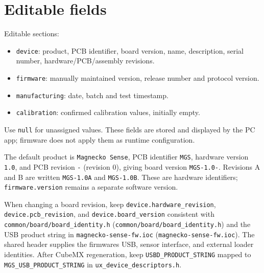 \documentclass[10pt,a4paper,oneside]{report}
\providecommand{\tightlist}{\setlength{\itemsep}{1pt}\setlength{\parskip}{1pt}}
\begin{document}
\section{Editable fields}\label{wiki-firmware-parameters--editable-fields}

Editable sections:

\begin{itemize}
\tightlist
\item
  \texttt{device}: product, PCB identifier, board version, name, description, serial number, hardware/PCB/assembly revisions.
\item
  \texttt{firmware}: manually maintained version, release number and protocol version.
\item
  \texttt{manufacturing}: date, batch and test timestamp.
\item
  \texttt{calibration}: confirmed calibration values, initially empty.
\end{itemize}

Use \texttt{null} for unassigned values. These fields are stored and displayed by the PC app; firmware does not apply them as runtime configuration.

The default product is \texttt{Magnecko Sense}, PCB identifier \texttt{MGS}, hardware version \texttt{1.\allowbreak{}0}, and PCB revision \texttt{-\allowbreak{}} (revision 0), giving board version \texttt{MGS-\allowbreak{}1.\allowbreak{}0-\allowbreak{}}. Revisions A and B are written \texttt{MGS-\allowbreak{}1.\allowbreak{}0A} and \texttt{MGS-\allowbreak{}1.\allowbreak{}0B}. These are hardware identifiers; \texttt{firmware.\allowbreak{}version} remains a separate software version.

When changing a board revision, keep \texttt{device.\allowbreak{}hardware\_\allowbreak{}revision}, \texttt{device.\allowbreak{}pcb\_\allowbreak{}revision}, and \texttt{device.\allowbreak{}board\_\allowbreak{}version} consistent with {\texttt{common/\allowbreak{}board/\allowbreak{}board\_\allowbreak{}identity.\allowbreak{}h} (\nolinkurl{common/board/board_identity.h})} and the USB product string in {\texttt{magnecko-\allowbreak{}sense-\allowbreak{}fw.\allowbreak{}ioc} (\nolinkurl{magnecko-sense-fw.ioc})}. The shared header supplies the firmware\textquotesingle s USB, sensor interface, and external loader identities. After CubeMX regeneration, keep \texttt{USBD\_\allowbreak{}PRODUCT\_\allowbreak{}STRING} mapped to \texttt{MGS\_\allowbreak{}USB\_\allowbreak{}PRODUCT\_\allowbreak{}STRING} in \texttt{ux\_\allowbreak{}device\_\allowbreak{}descriptors.\allowbreak{}h}.
\end{document}
